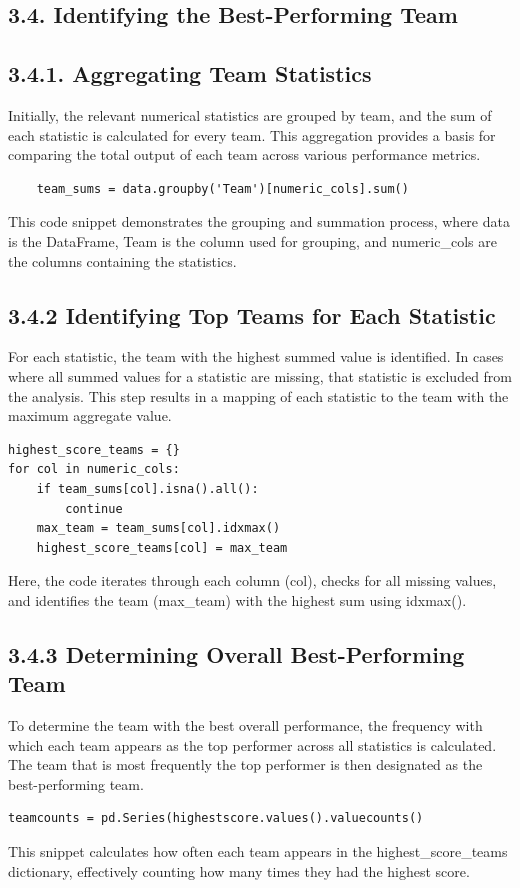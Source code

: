 \documentclass[a4paper,12pt]{article}
\begin{document}
\subsection*{\textbf{\Large 3.4. Identifying the Best-Performing Team
}}
\subsection*{\textbf{3.4.1. Aggregating Team Statistics
}}
Initially, the relevant numerical statistics are grouped by team, and the sum of each statistic is calculated for every team. This aggregation provides a basis for comparing the total output of each team across various performance metrics.
\begin{mdframed}
\begin{verbatim}
    team_sums = data.groupby('Team')[numeric_cols].sum()  
\end{verbatim}
\end{mdframed}
This code snippet demonstrates the grouping and summation process, where data is the DataFrame, Team is the column used for grouping, and numeric\_cols are the columns containing the statistics.
\subsection*{\textbf{3.4.2 Identifying Top Teams for Each Statistic
}}
For each statistic, the team with the highest summed value is identified. In cases where all summed values for a statistic are missing, that statistic is excluded from the analysis. This step results in a mapping of each statistic to the team with the maximum aggregate value.  
\begin{mdframed}
\begin{verbatim}
highest_score_teams = {}
for col in numeric_cols:
    if team_sums[col].isna().all():
        continue
    max_team = team_sums[col].idxmax()
    highest_score_teams[col] = max_team
\end{verbatim}
\end{mdframed}
Here, the code iterates through each column (col), checks for all missing values, and identifies the team (max\_team) with the highest sum using idxmax().
\subsection*{\textbf{3.4.3 Determining Overall Best-Performing Team
}}
To determine the team with the best overall performance, the frequency with which each team appears as the top performer across all statistics is calculated. The team that is most frequently the top performer is then designated as the best-performing team.  
\begin{mdframed}
\begin{verbatim}
teamcounts = pd.Series(highestscore.values().valuecounts()
\end{verbatim}
\end{mdframed}
This snippet calculates how often each team appears in the highest\_score\_teams dictionary, effectively counting how many times they had the highest score.
\end{document}
